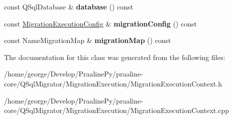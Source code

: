 \begin{DoxyCompactItemize}
const Q\+Sql\+Database \& {\bfseries database} () const
\item 
\mbox{\label{class_q_sql_migrator_1_1_migration_execution_1_1_migration_execution_context_afbe159899dab0fd750e1352ea5a6c41c}} 
const \hyperlink{struct_q_sql_migrator_1_1_migration_execution_1_1_migration_execution_config}{Migration\+Execution\+Config} \& {\bfseries migration\+Config} () const
\item 
\mbox{\label{class_q_sql_migrator_1_1_migration_execution_1_1_migration_execution_context_adf63c34d30d0c1d651c9e93edc579405}} 
const Name\+Migration\+Map \& {\bfseries migration\+Map} () const
\end{DoxyCompactItemize}


The documentation for this class was generated from the following files\+:\begin{DoxyCompactItemize}
\item 
/home/george/\+Develop/\+Praaline\+Py/praaline-\/core/\+Q\+Sql\+Migrator/\+Migration\+Execution/Migration\+Execution\+Context.\+h\item 
/home/george/\+Develop/\+Praaline\+Py/praaline-\/core/\+Q\+Sql\+Migrator/\+Migration\+Execution/Migration\+Execution\+Context.\+cpp\end{DoxyCompactItemize}
